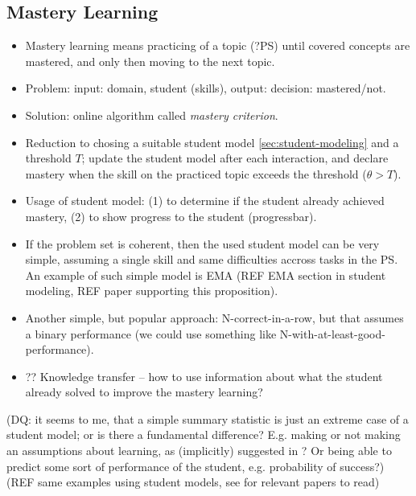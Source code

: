 \subsection{Mastery Learning}
\label{sec:mastery-learning}

\begin{itemize}
\item Mastery learning means practicing of a topic (?PS) until covered concepts
  are mastered, and only then moving to the next topic.
\item Problem: input: domain, student (skills), output: decision: mastered/not.
\item Solution: online algorithm called \emph{mastery criterion}.
\item Reduction to chosing a suitable student model \ref{sec:student-modeling}
  and a threshold $T$;
  update the student model after each interaction,
  and declare mastery when the skill
  on the practiced topic exceeds the threshold
  ($\theta > T$).
\item Usage of student model:
  (1) to determine if the student already achieved mastery,
  (2) to show progress to the student (progressbar).
\item If the problem set is coherent, then the used student model can be very
  simple, assuming a single skill and same difficulties accross tasks in the PS.
  An example of such simple model is EMA
  (REF EMA section in student modeling, REF paper supporting this proposition).
\item Another simple, but popular approach: N-correct-in-a-row, but that assumes
  a binary performance (we could use something like N-with-at-least-good-performance).
\item ?? Knowledge transfer -- how to use information about what the student
  already solved to improve the mastery learning?
\end{itemize}


(DQ: it seems to me, that a simple summary statistic is just an extreme case of
a student model; or is there a fundamental difference? E.g. making or not
making an assumptions about learning, as (implicitly) suggested in \cite{alg.mastery}?
Or being able to predict some sort of performance of the student, e.g. probability of
success?)
(REF same examples using student models, see \cite{alg.mastery} for relevant
papers to read)

